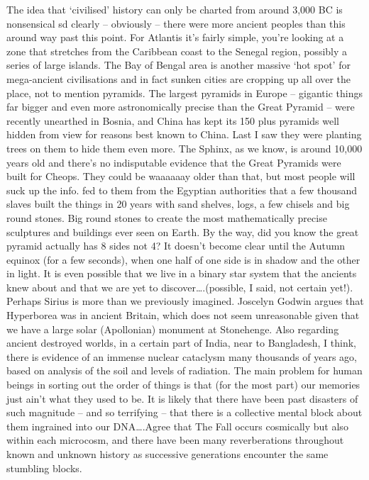 \begin{footnotesize}
\begin{sffamily}
The idea that `civilised' history can only be charted from around 3,000 BC is nonsensical sd clearly – obviously – there were more ancient peoples than this around way past this point. For Atlantis it's fairly simple, you're looking at a zone that stretches from the Caribbean coast to the Senegal region, possibly a series of large islands. The Bay of Bengal area is another massive `hot spot' for mega-ancient civilisations and in fact sunken cities are cropping up all over the place, not to mention pyramids. The largest pyramids in Europe – gigantic things far bigger and even more astronomically precise than the Great Pyramid – were recently unearthed in Bosnia, and China has kept its 150 plus pyramids well hidden from view for reasons best known to China. Last I saw they were planting trees on them to hide them even more. The Sphinx, as we know, is around 10,000 years old and there's no indisputable evidence that the Great Pyramids were built for Cheops. They could be waaaaaay older than that, but most people will suck up the info. fed to them from the Egyptian authorities that a few thousand slaves built the things in 20 years with sand shelves, logs, a few chisels and big round stones. Big round stones to create the most mathematically precise sculptures and buildings ever seen on Earth. By the way, did you know the great pyramid actually has 8 sides not 4? It doesn't become clear until the Autumn equinox (for a few seconds), when one half of one side is in shadow and the other in light. It is even possible that we live in a binary star system that the ancients knew about and that we are yet to discover….(possible, I said, not certain yet!). Perhaps Sirius is more than we previously imagined. Joscelyn Godwin argues that Hyperborea was in ancient Britain, which does not seem unreasonable given that we have a large solar (Apollonian) monument at Stonehenge. Also regarding ancient destroyed worlds, in a certain part of India, near to Bangladesh, I think, there is evidence of an immense nuclear cataclysm many thousands of years ago, based on analysis of the soil and levels of radiation. The main problem for human beings in sorting out the order of things is that (for the most part) our memories just ain't what they used to be. It is likely that there have been past disasters of such magnitude – and so terrifying – that there is a collective mental block about them ingrained into our DNA….Agree that The Fall occurs cosmically but also within each microcosm, and there have been many reverberations throughout known and unknown history as successive generations encounter the same stumbling blocks.



\end{sffamily}
\end{footnotesize}
